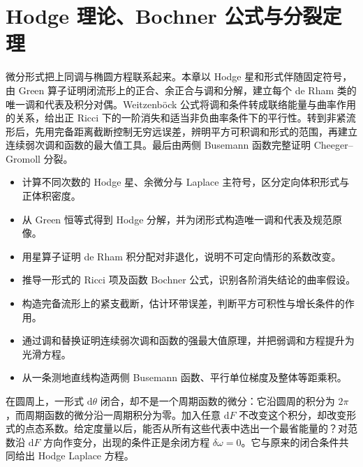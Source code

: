 
% 
% 

\chapter{Hodge 理论、Bochner 公式与分裂定理}
\label{g3:ch:15}

\begin{chapterabstract}
	微分形式把上同调与椭圆方程联系起来。本章以 Hodge 星和形式伴随固定符号，由 Green 算子证明闭流形上的正合、余正合与调和分解，建立每个 de Rham 类的唯一调和代表及积分对偶。Weitzenböck 公式将调和条件转成联络能量与曲率作用的关系，给出正 Ricci 下的一阶消失和适当非负曲率条件下的平行性。转到非紧流形后，先用完备距离截断控制无穷远误差，辨明平方可积调和形式的范围，再建立连续弱次调和函数的最大值工具。最后由两侧 Busemann 函数完整证明 Cheeger--Gromoll 分裂。
\end{chapterabstract}

\begin{learninggoals}
	\begin{itemize}
		\item 计算不同次数的 Hodge 星、余微分与 Laplace 主符号，区分定向体积形式与正体积密度。
		\item 从 Green 恒等式得到 Hodge 分解，并为闭形式构造唯一调和代表及规范原像。
		\item 用星算子证明 de Rham 积分配对非退化，说明不可定向情形的系数改变。
		\item 推导一形式的 Ricci 项及函数 Bochner 公式，识别各阶消失结论的曲率假设。
		\item 构造完备流形上的紧支截断，估计环带误差，判断平方可积性与增长条件的作用。
		\item 通过调和替换证明连续弱次调和函数的强最大值原理，并把弱调和方程提升为光滑方程。
		\item 从一条测地直线构造两侧 Busemann 函数、平行单位梯度及整体等距乘积。
	\end{itemize}
\end{learninggoals}

在圆周上，一形式 \(\mathrm d\theta\) 闭合，却不是一个周期函数的微分：它沿圆周的积分为 \(2\pi\)，而周期函数的微分沿一周期积分为零。加入任意 \(\mathrm dF\) 不改变这个积分，却改变形式的点态系数。给定度量以后，能否从所有这些代表中选出一个最省能量的？对范数沿 \(\mathrm dF\) 方向作变分，出现的条件正是余闭方程 \(\delta\omega=0\)。它与原来的闭合条件共同给出 Hodge Laplace 方程。

